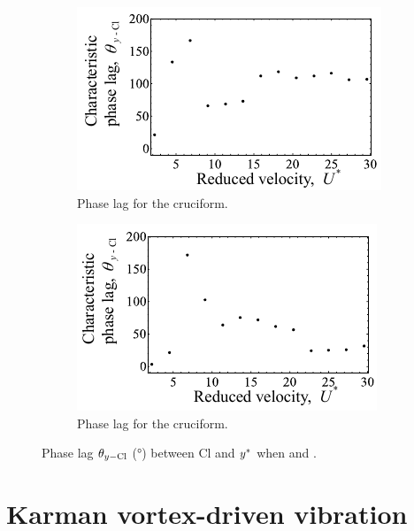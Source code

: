 \documentclass[oneside]{utmthesis}
\begin{document}
\begin{figure}
  \centering
  \begin{subfigure}[h]{0.4\textwidth}
    \includegraphics[width=\textwidth]{figs/phaseLag4}
    \caption{Phase lag for the \angfo{} cruciform.}
    \label{fig:phaseLag675deg}
  \end{subfigure}
  \hspace{6mm}
  \begin{subfigure}[h]{0.4\textwidth}
    \includegraphics[width=\textwidth]{figs/phaseLag3}
    \caption{Phase lag for the \angth{} cruciform.}
    \label{fig:phaseLag45deg}
  \end{subfigure}

  \caption{Phase lag $\theta_{y-\text{Cl}}$ (\si{\degree}) between Cl and $y^{*}$ when \angfo{} and \angth{}.}
  \label{fig:phaseLag67545deg}
\end{figure}


\chapter{Karman vortex-driven vibration}\label{chap:kvivRegime}
\end{document}
